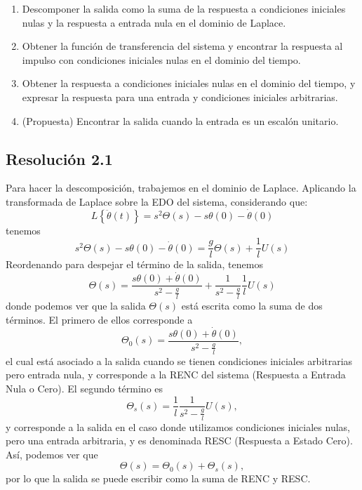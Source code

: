 \documentclass[
  11pt,
  letterpaper,
   addpoints,
   answers
  ]{exam}
\begin{document}
\begin{questions}
    \begin{enumerate}
        \item Descomponer la salida como la suma de la respuesta a condiciones iniciales nulas y la respuesta a entrada nula en el dominio de Laplace.
        \item Obtener la función de transferencia del sistema y encontrar la respuesta al impulso con condiciones iniciales nulas en el dominio del tiempo.
        \item Obtener la respuesta a condiciones iniciales nulas en el dominio del tiempo, y expresar la respuesta para una entrada y condiciones iniciales arbitrarias.
        \item (Propuesta) Encontrar la salida cuando la entrada es un escalón unitario.
    \end{enumerate}


\begin{solution}
\subsection*{Resolución 2.1}
Para hacer la descomposición, trabajemos en el dominio de Laplace. Aplicando la transformada de Laplace sobre la EDO del sistema, considerando que:
\begin{equation}
L\left\{ \ddot{\theta}(t) \right\} = s^2 \Theta(s) - s \theta(0) - \dot{\theta}(0)
\end{equation}
tenemos
\begin{equation}
s^2 \Theta(s) - s \theta(0) - \dot{\theta}(0) = \frac{g}{l} \Theta(s) + \frac{1}{l} U(s)
\end{equation}
Reordenando para despejar el término de la salida, tenemos
\begin{equation}
\Theta(s) = \frac{s\theta(0) + \dot{\theta}(0)}{s^2 - \frac{g}{l}} + \frac{1}{s^2 - \frac{g}{l}} \frac{1}{l} U(s)
\end{equation}
donde podemos ver que la salida \(\Theta(s)\) está escrita como la suma de dos términos. El primero de ellos corresponde a
\begin{equation}
\Theta_0(s) = \frac{s \theta(0) + \dot{\theta}(0)}{s^2 - \frac{g}{l}},
\end{equation}
el cual está asociado a la salida cuando se tienen condiciones iniciales arbitrarias pero entrada nula, y corresponde a la RENC del sistema (Respuesta a Entrada Nula o Cero). El segundo término es
\begin{equation}
\Theta_s(s) = \frac{1}{l} \frac{1}{s^2 - \frac{g}{l}} U(s),
\end{equation}
y corresponde a la salida en el caso donde utilizamos condiciones iniciales nulas, pero una entrada arbitraria, y es denominada RESC (Respuesta a Estado Cero). Así, podemos ver que
\begin{equation}
\Theta(s) = \Theta_0(s) + \Theta_s(s),
\end{equation}
por lo que la salida se puede escribir como la suma de RENC y RESC.


\end{solution}
\end{questions}
\end{document}
